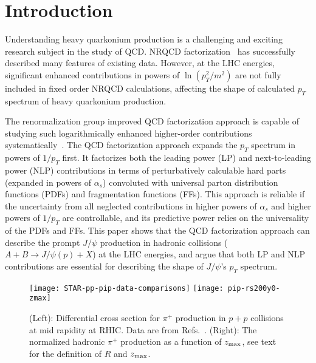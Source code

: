 \documentclass[Physsubmission, Phys]{SciPost}
\begin{document}
\section{Introduction}
\label{sec:intro}

Understanding heavy quarkonium production is a challenging and exciting research subject in the study of QCD. NRQCD factorization~\cite{Bodwin:1994jh} has successfully described many features of existing data. However, at the LHC energies, significant enhanced contributions in powers of $\ln(p_T^2/m^2)$ are not fully included in fixed order NRQCD calculations, affecting the shape of calculated $p_T$ spectrum of heavy quarkonium production. 

The renormalization group improved QCD factorization approach is capable of studying such logarithmically enhanced higher-order contributions systematically~\cite{Nayak:2005rt,Kang:2014tta}. 
The QCD factorization approach expands the $p_T$ spectrum in powers of $1/p_T$ first. It factorizes both the leading power (LP) and next-to-leading power (NLP) contributions in terms of perturbatively calculable hard parts (expanded in powers of $\alpha_s$) convoluted with universal parton distribution functions (PDFs) and fragmentation functions (FFs).  This approach is reliable if the uncertainty from all neglected contributions in higher powers of $\alpha_s$ and higher powers of $1/p_T$ are controllable, and its predictive power relies on the universality of the PDFs and FFs.  This paper shows that the QCD factorization approach can describe the prompt $J/\psi$ production in hadronic collisions ($A+B\to J/\psi(p)+X$) at the LHC energies, and argue that both LP and NLP contributions are essential for describing the shape of $J/\psi$'s $p_T$ spectrum.


\begin{figure}[t]
\centering
\texttt{[image: STAR-pp-pip-data-comparisons]}
\texttt{[image: pip-rs200y0-zmax]}
\caption{(Left): Differential cross section for $\pi^+$ production in $p+p$ collisions at mid rapidity at RHIC.
Data are from Refs.~\cite{STAR:2006xud,STAR:2011iap}. 
(Right): The normalized 
hadronic $\pi^+$ production as a function of $z_{\rm max}$, see text for the definition of $R$ and $z_{\rm max}$.}
\label{fig:pip-RHIC}
\end{figure}
\end{document}
